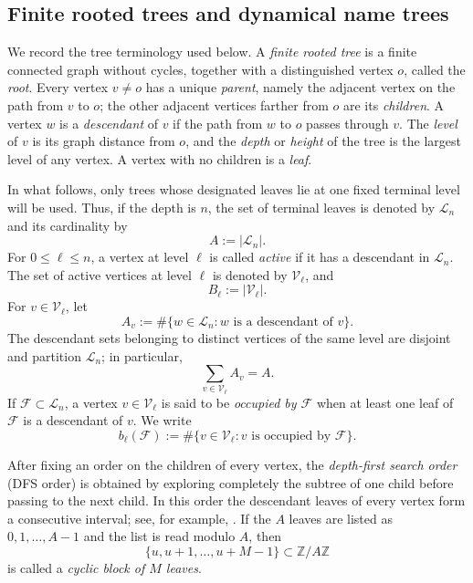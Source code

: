\documentclass[12pt,letterpaper,reqno]{amsart}
\newcommand{\Z}{\mathbb Z}
\theoremstyle{definition}
\theoremstyle{remark}
\numberwithin{equation}{section}
\begin{document}
	\subsection{Finite rooted trees and dynamical name trees}\label{sec:name trees}

	We record the tree terminology used below.  A \emph{finite rooted tree} is a
	finite connected graph without cycles, together with a distinguished vertex
	$o$, called the \emph{root}.  Every vertex $v\neq o$ has a unique
	\emph{parent}, namely the adjacent vertex on the path from $v$ to $o$; the
	other adjacent vertices farther from $o$ are its \emph{children}.  A vertex
	$w$ is a \emph{descendant} of $v$ if the path from $w$ to $o$ passes through
	$v$.  The \emph{level} of $v$ is its graph distance from $o$, and the
	\emph{depth} or \emph{height} of the tree is the largest level of any vertex.  A vertex with
	no children is a \emph{leaf}.

	In what follows, only trees whose designated leaves lie at one fixed terminal level will be used.  Thus, if the depth is $n$, the set of terminal leaves is denoted by
	$\mathcal L_n$ and its cardinality by
	\[
	A:=|\mathcal L_n|.
	\]
	For $0\leq\ell\leq n$, a vertex at level $\ell$ is called \emph{active} if
	it has a descendant in $\mathcal L_n$.  The set of active vertices at level
	$\ell$ is denoted by $\mathcal V_\ell$, and
	\[
	B_\ell:=|\mathcal V_\ell|.
	\]
	For $v\in\mathcal V_\ell$, let
	\[
	A_v:=\#\{w\in\mathcal L_n:w\text{ is a descendant of }v\}.
	\]
	The descendant sets belonging to distinct vertices of the same level are
	disjoint and partition $\mathcal L_n$; in particular,
	\begin{equation}
		\sum_{v\in\mathcal V_\ell}A_v=A.
		\label{eq:descendant-partition}
	\end{equation}
	If $\mathcal F\subset\mathcal L_n$, a vertex $v\in\mathcal V_\ell$ is said to be
	\emph{occupied by $\mathcal F$} when at least one leaf of $\mathcal F$ is a
	descendant of $v$.  We write
	\[
	b_\ell(\mathcal F)
	:=
	\#\{v\in\mathcal V_\ell:v\text{ is occupied by }\mathcal F\}.
	\]

	After fixing an order on the children of every vertex, the \emph{depth-first
	search order} (DFS order) is obtained by exploring completely the subtree of
	one child before passing to the next child.  In this order the descendant
	leaves of every vertex form a consecutive interval; see, for example,
	\cite{Tarjan1972,CLRS2022}.  If the $A$ leaves are
	listed as $0,1,\ldots,A-1$ and the list is read modulo $A$, then
	\[
	\{u,u+1,\ldots,u+M-1\}\subset\Z/A\Z
	\]
	is called a \emph{cyclic block of $M$ leaves}.
\end{document}
